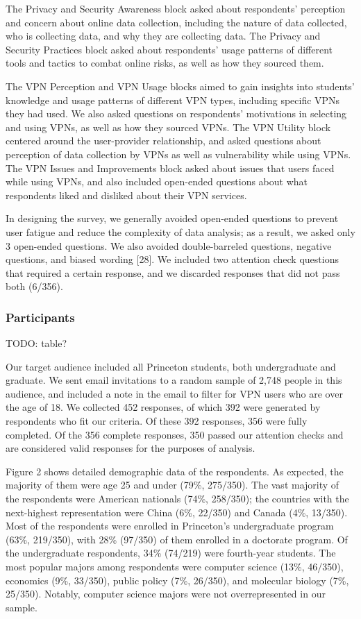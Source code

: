 The Privacy and Security Awareness block asked about respondents’ perception and concern about online data collection, including the nature of data collected, who is collecting data, and why they are collecting data. The Privacy and Security Practices block asked about respondents’ usage patterns of different tools and tactics to combat online risks, as well as how they sourced them.

The VPN Perception and VPN Usage blocks aimed to gain insights into students’ knowledge and usage patterns of different VPN types, including specific VPNs they had used. We also asked questions on respondents’ motivations in selecting and using VPNs, as well as how they sourced VPNs. The VPN Utility block centered around the user-provider relationship, and asked questions about perception of data collection by VPNs as well as vulnerability while using VPNs. The VPN Issues and Improvements block asked about issues that users faced while using VPNs, and also included open-ended questions about what respondents liked and disliked about their VPN services.

In designing the survey, we generally avoided open-ended questions to prevent user fatigue and reduce the complexity of data analysis; as a result, we asked only 3 open-ended questions. We also avoided double-barreled questions, negative questions, and biased wording [28]. We included two attention check questions that required a certain response, and we discarded responses that did not pass both (6/356).

\subsubsection{Participants}

TODO: table?

Our target audience included all Princeton students, both undergraduate and graduate. We sent email invitations to a random sample of 2,748 people in this audience, and included a note in the email to filter for VPN users who are over the age of 18. We collected 452 responses, of which 392 were generated by respondents who fit our criteria. Of these 392 responses, 356 were fully completed. Of the 356 complete responses, 350 passed our attention checks and are considered valid responses for the purposes of analysis.

Figure 2 shows detailed demographic data of the respondents. As expected, the majority of them were age 25 and under (79\%, 275/350). The vast majority of the respondents were American nationals (74\%, 258/350); the countries with the next-highest representation were China (6\%, 22/350) and Canada (4\%, 13/350). Most of the respondents were enrolled in Princeton’s undergraduate program (63\%, 219/350), with 28\% (97/350) of them enrolled in a doctorate program. Of the undergraduate respondents, 34\% (74/219) were fourth-year students. The most popular majors among respondents were computer science (13\%, 46/350), economics (9\%, 33/350), public policy (7\%, 26/350), and molecular biology (7\%, 25/350). Notably, computer science majors were not overrepresented in our sample.

